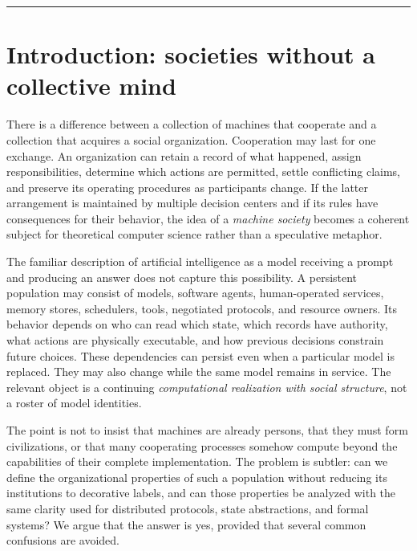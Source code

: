 \documentclass[11pt,letterpaper]{article}
\theoremstyle{plain}
\theoremstyle{definition}
\theoremstyle{remark}
\begin{document}
\begin{titlepage}
\vfill
\noindent\rule{\textwidth}{.4pt}\par\smallskip
{}
\end{titlepage}
\hypersetup{pageanchor=true}
\begingroup\small\setlength{\parskip}{0pt}\tableofcontents\endgroup\clearpage
{}
\section{Introduction: societies without a collective mind}\label{sec:introduction}

There is a difference between a collection of machines that cooperate and a collection that acquires a social organization. Cooperation may last for one exchange. An organization can retain a record of what happened, assign responsibilities, determine which actions are permitted, settle conflicting claims, and preserve its operating procedures as participants change. If the latter arrangement is maintained by multiple decision centers and if its rules have consequences for their behavior, the idea of a \emph{machine society} becomes a coherent subject for theoretical computer science rather than a speculative metaphor.

The familiar description of artificial intelligence as a model receiving a prompt and producing an answer does not capture this possibility. A persistent population may consist of models, software agents, human-operated services, memory stores, schedulers, tools, negotiated protocols, and resource owners. Its behavior depends on who can read which state, which records have authority, what actions are physically executable, and how previous decisions constrain future choices. These dependencies can persist even when a particular model is replaced. They may also change while the same model remains in service. The relevant object is a continuing \emph{computational realization with social structure}, not a roster of model identities.

The point is not to insist that machines are already persons, that they must form civilizations, or that many cooperating processes somehow compute beyond the capabilities of their complete implementation. The problem is subtler: can we define the organizational properties of such a population without reducing its institutions to decorative labels, and can those properties be analyzed with the same clarity used for distributed protocols, state abstractions, and formal systems? We argue that the answer is yes, provided that several common confusions are avoided.
\end{document}
